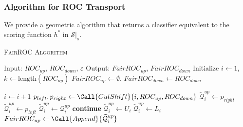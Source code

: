 \documentclass{article}
\begin{document}
\subsubsection{Algorithm for ROC Transport}
We provide a geometric algorithm that returns a classifier equivalent to the scoring function $h^*$ in $\mathcal{S}|_s$.%


\begin{algorithm}
\caption{\textsc{FairROC Algorithm}}
\label{alg:fairroc}
\begin{algorithmic}[1]
\State Input: $ROC_{up}$, $ROC_{down}$, $\varepsilon$
\State Output: $FairROC_{up}$, $FairROC_{down}$
\State Initialize $i \gets 1$, $k \gets \text{length}(ROC_{up})$
\State $FairROC_{up} \gets \emptyset$, $FairROC_{down} \gets ROC_{down}$

    \State $i \gets i+1$
        \State $p_{left}, p_{right} \gets \Call{CutShift}{i, ROC_{up}, ROC_{down}}$
            \State $\widetilde{\mathcal{Q}}_i^{up} \gets p_{right}$
        \Else
            \State $\widetilde{\mathcal{Q}}_i^{up} \gets p_{left}$
        \EndIf
        \State $\widetilde{\mathcal{Q}}_i^{up} \gets \mathcal{Q}_i^{up}$
        \State \textbf{continue}
    \Else
            \State $\widetilde{\mathcal{Q}}_i^{up} \gets U_i$
        \Else
            \State $\widetilde{\mathcal{Q}}_i^{up} \gets L_i$
        \EndIf
    \EndIf
    \State $FairROC_{up} \gets \Call{Append}{\widetilde{\mathcal{Q}}_i^{up}}$
\EndWhile

\end{algorithmic}
\end{algorithm}



\end{document}
